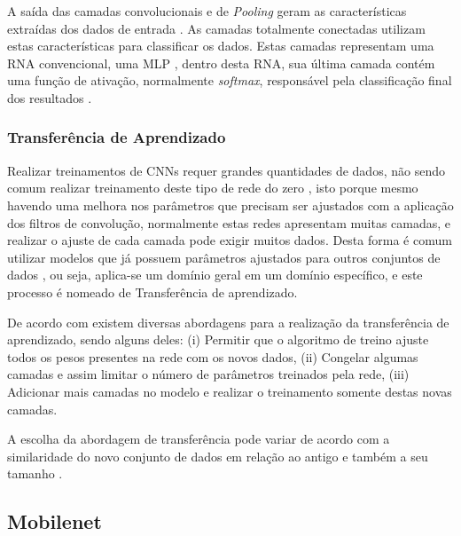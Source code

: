 A saída das camadas convolucionais e de \textit{Pooling} geram as características extraídas dos dados de entrada \cite{Carneiro2017}. As camadas totalmente conectadas utilizam estas características para classificar os dados. Estas camadas representam uma RNA convencional, uma MLP \cite{Haykin2001}, dentro desta RNA, sua última camada contém uma função de ativação, normalmente \textit{softmax}, responsável pela classificação final dos resultados \cite{Bishop2006}. 

\subsubsection{Transferência de Aprendizado}

Realizar treinamentos de CNNs requer grandes quantidades de dados, não sendo comum realizar treinamento deste tipo de rede do zero \cite{Carneiro2017}, isto porque mesmo havendo uma melhora nos parâmetros que precisam ser ajustados com a aplicação dos filtros de convolução, normalmente estas redes apresentam muitas camadas, e realizar o ajuste de cada camada pode exigir muitos dados. Desta forma é comum utilizar modelos que já possuem parâmetros ajustados para outros conjuntos de dados \cite{Ponti2018}, ou seja, aplica-se um domínio geral em um domínio específico, e este processo é nomeado de Transferência de aprendizado.

De acordo com  existem diversas abordagens para a realização da transferência de aprendizado, sendo alguns deles: (i) Permitir que o algoritmo de treino ajuste todos os pesos presentes na rede com os novos dados, (ii) Congelar algumas camadas e assim limitar o número de parâmetros treinados pela rede, (iii) Adicionar mais camadas no modelo e realizar o treinamento somente destas novas camadas.

A escolha da abordagem de transferência pode variar de acordo com a similaridade do novo conjunto de dados em relação ao antigo e também a seu tamanho \cite{Carneiro2017}.


\subsection{Mobilenet}

